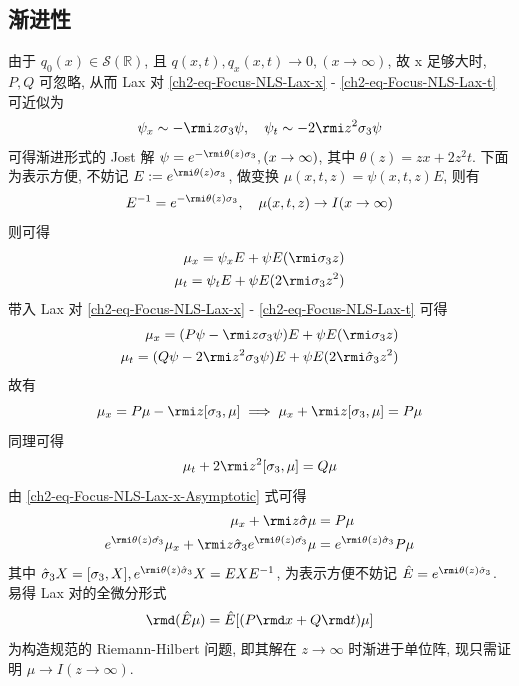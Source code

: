 \subsection{渐进性}

由于 $ q_{0}(x) \in \mathcal{S}(\mathbb{R}) $, 且 $ q(x,t), q_{x}(x,t) \to 0, (x \to \infty) $, 故 x 足够大时, $ P, Q $ 可忽略, 从而 Lax 对 \eqref{ch2-eq-Focus-NLS-Lax-x} - \eqref{ch2-eq-Focus-NLS-Lax-t} 可近似为
\begin{equation*}
    \psi_{x} \sim - \rmi z \sigma_{3} \psi, \quad \psi_{t} \sim - 2\rmi z^2 \sigma_{3} \psi
\end{equation*}
可得渐进形式的 Jost 解 $ \psi = e^{- \rmi \theta(z) \sigma_{3}}, (x \to \infty) $, 其中 $ \theta(z) = z x + 2z^2 t $. 下面为表示方便, 不妨记 $ E := e^{ \rmi \theta(z) \sigma_{3}} $, 做变换 $ \mu(x,t,z) = \psi(x,t,z)E $, 则有
\begin{equation}
    E^{-1} = e^{-\rmi \theta(z) \sigma_{3}}, \quad \mu(x,t,z) \to I( x \to \infty) \label{ch2-eq-mu-asymptomatic}
\end{equation}
则可得
\begin{align}
    \mu_{x} = \psi_{x}E + \psi E (\rmi \sigma_{3} z) \\
    \mu_{t} = \psi_{t}E + \psi E (2 \rmi \sigma_{3} z^2)
\end{align}
带入 Lax 对 \eqref{ch2-eq-Focus-NLS-Lax-x} - \eqref{ch2-eq-Focus-NLS-Lax-t} 可得
\begin{align}
    \mu_{x} = (P \psi - \rmi z \sigma_{3} \psi)E + \psi E(\rmi \sigma_{3} z) \\
    \mu_{t} = (Q \psi - 2 \rmi z^2 \sigma_{3} \psi)E + \psi E (2 \rmi \hat{\sigma}_{3} z^2)
\end{align}
故有
\begin{equation}
    \mu_{x} = P\mu -\rmi z [\sigma_{3}, \mu] \implies \mu_{x} + \rmi z [\sigma_{3}, \mu] = P \mu \label{ch2-eq-Focus-NLS-Lax-x-Asymptotic}
\end{equation}
同理可得
\begin{equation}
    \mu_{t} + 2 \rmi z^2 [\sigma_{3}, \mu] = Q \mu \label{ch2-eq-Focus-NLS-Lax-t-Asymptotic}
\end{equation}
由 \eqref{ch2-eq-Focus-NLS-Lax-x-Asymptotic} 式可得
\begin{align}
    \mu_{x} + \rmi z \hat{\sigma} \mu                                                                             & = P \mu                                     \\
    e^{\rmi \theta(z) \hat{\sigma_{3}}} \mu_{x} + \rmi z \hat{\sigma}_{3} e^{\rmi \theta(z) \hat{\sigma_{3}}} \mu & = e^{\rmi \theta(z) \hat{\sigma}_{3}} P \mu
\end{align}
其中 $ \hat{\sigma}_{3}X = [\sigma_{3}, X], e^{\rmi \theta(z) \hat{\sigma}_{3}} X = E X E^{-1} $, 为表示方便不妨记 $ \hat{E} = e^{\rmi \theta(z) \hat{\sigma}_{3}} $.
易得 Lax 对的全微分形式
\begin{equation}
    \rmd (\hat{E} \mu) = \hat{E} [ (P \rmd x + Q \rmd t) \mu ] \label{ch2-eq-diffision-mu}
\end{equation}
为构造规范的 Riemann-Hilbert 问题, 即其解在 $ z \to \infty $ 时渐进于单位阵, 现只需证明 $ \mu \to I (z \to \infty) $.

